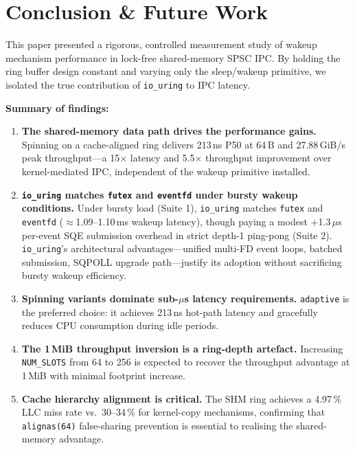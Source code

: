 \documentclass[10pt,conference]{IEEEtran}
\begin{document}
\section{Conclusion \& Future Work}

This paper presented a rigorous, controlled measurement study of wakeup
mechanism performance in lock-free shared-memory SPSC IPC.  By holding the
ring buffer design constant and varying only the sleep/wakeup primitive,
we isolated the true contribution of \texttt{io\_uring} to IPC latency.

\textbf{Summary of findings:}

\begin{enumerate}
  \item \textbf{The shared-memory data path drives the performance gains.}
        Spinning on a cache-aligned ring delivers 213\,ns P50 at 64\,B and
        27.88\,GiB/s peak throughput---a 15$\times$ latency and 5.5$\times$
        throughput improvement over kernel-mediated IPC, independent of
        the wakeup primitive installed.

  \item \textbf{\texttt{io\_uring} matches \texttt{futex} and \texttt{eventfd}
        under bursty wakeup conditions.}  Under bursty load (Suite 1), \texttt{io\_uring}
        matches \texttt{futex} and \texttt{eventfd} ($\approx$1.09--1.10\,ms wakeup latency),
        though paying a modest +1.3\,$\mu$s per-event SQE submission overhead in strict
        depth-1 ping-pong (Suite 2).  \texttt{io\_uring}'s architectural advantages---unified
        multi-FD event loops, batched submission, SQPOLL upgrade path---justify its adoption
        without sacrificing bursty wakeup efficiency.

  \item \textbf{Spinning variants dominate sub-$\mu$s latency requirements.}
        \texttt{adaptive} is the preferred choice: it achieves 213\,ns
        hot-path latency and gracefully reduces CPU consumption during
        idle periods.

  \item \textbf{The 1\,MiB throughput inversion is a ring-depth artefact.}
        Increasing \texttt{NUM\_SLOTS} from 64 to 256 is expected to recover
        the throughput advantage at 1\,MiB with minimal footprint increase.

  \item \textbf{Cache hierarchy alignment is critical.}  The SHM ring achieves
        a 4.97\,\% LLC miss rate vs.\ 30--34\,\% for kernel-copy mechanisms,
        confirming that \texttt{alignas(64)} false-sharing prevention is
        essential to realising the shared-memory advantage.
\end{enumerate}
\end{document}
